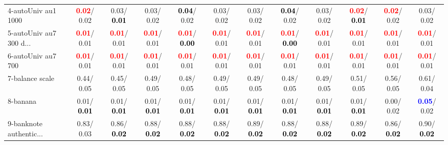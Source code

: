 \begin{table}[h]
\begin{center}
{\begin{tabular}{lc|c|c|c|c|c|c|c|c|c|c}
4-autoUniv au1 1000 & \textcolor{red}{\textbf{  0.02}}/  0.02 &   0.03/\textcolor{black}{\textbf{  0.01}} &   0.03/  0.02 & \textcolor{black}{\textbf{  0.04}}/  0.02 &   0.03/  0.02 &   0.03/  0.02 & \textcolor{black}{\textbf{  0.04}}/  0.02 &   0.03/  0.02 & \textcolor{red}{\textbf{  0.02}}/\textcolor{black}{\textbf{  0.01}} & \textcolor{red}{\textbf{  0.02}}/  0.02 &   0.03/  0.02 \\
5-autoUniv au7 300 d... & \textcolor{red}{\textbf{  0.01}}/  0.01 & \textcolor{red}{\textbf{  0.01}}/  0.01 & \textcolor{red}{\textbf{  0.01}}/  0.01 & \textcolor{red}{\textbf{  0.01}}/\textcolor{black}{\textbf{  0.00}} & \textcolor{red}{\textbf{  0.01}}/  0.01 & \textcolor{red}{\textbf{  0.01}}/  0.01 & \textcolor{red}{\textbf{  0.01}}/\textcolor{black}{\textbf{  0.00}} & \textcolor{red}{\textbf{  0.01}}/  0.01 & \textcolor{red}{\textbf{  0.01}}/  0.01 & \textcolor{red}{\textbf{  0.01}}/  0.01 & \textcolor{red}{\textbf{  0.01}}/  0.01 \\
6-autoUniv au7 700 & \textcolor{red}{\textbf{  0.01}}/  0.01 & \textcolor{red}{\textbf{  0.01}}/  0.01 & \textcolor{red}{\textbf{  0.01}}/  0.01 & \textcolor{red}{\textbf{  0.01}}/  0.01 & \textcolor{red}{\textbf{  0.01}}/  0.01 & \textcolor{red}{\textbf{  0.01}}/  0.01 & \textcolor{red}{\textbf{  0.01}}/  0.01 & \textcolor{red}{\textbf{  0.01}}/  0.01 & \textcolor{red}{\textbf{  0.01}}/  0.01 & \textcolor{red}{\textbf{  0.01}}/  0.01 & \textcolor{red}{\textbf{  0.01}}/  0.01 \\
7-balance scale &   0.44/  0.05 &   0.45/  0.05 &   0.49/  0.05 &   0.48/  0.05 &   0.49/  0.05 &   0.49/  0.05 &   0.48/  0.05 &   0.49/  0.05 &   0.51/  0.05 &   0.56/  0.05 &   0.61/  0.04 \\ \hline
8-banana &   0.01/\textcolor{black}{\textbf{  0.01}} &   0.01/\textcolor{black}{\textbf{  0.01}} &   0.01/\textcolor{black}{\textbf{  0.01}} &   0.01/\textcolor{black}{\textbf{  0.01}} &   0.01/\textcolor{black}{\textbf{  0.01}} &   0.01/\textcolor{black}{\textbf{  0.01}} &   0.01/\textcolor{black}{\textbf{  0.01}} &   0.01/\textcolor{black}{\textbf{  0.01}} &   0.01/\textcolor{black}{\textbf{  0.01}} &   0.00/  0.02 & \textcolor{blue}{\textbf{  0.05}}/  0.02 \\
9-banknote authentic... &   0.83/  0.03 &   0.86/\textcolor{black}{\textbf{  0.02}} &   0.88/\textcolor{black}{\textbf{  0.02}} &   0.88/\textcolor{black}{\textbf{  0.02}} &   0.88/\textcolor{black}{\textbf{  0.02}} &   0.89/\textcolor{black}{\textbf{  0.02}} &   0.88/\textcolor{black}{\textbf{  0.02}} &   0.88/\textcolor{black}{\textbf{  0.02}} &   0.89/\textcolor{black}{\textbf{  0.02}} &   0.86/\textcolor{black}{\textbf{  0.02}} &   0.90/\textcolor{black}{\textbf{  0.02}} \\

\end{tabular}}
\end{center}
\end{table}
